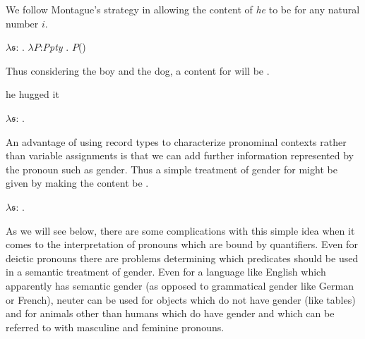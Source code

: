 We follow Montague's strategy in allowing the content of \textit{he}
to be \nexteg{} for any natural number $i$.
\begin{ex}
$\lambda\mathfrak{s}$: . 
        $\lambda P$:\textit{Ppty}
        . $P$()
\label{ex:pronoun-cont}
\end{ex} 
Thus considering the boy and the dog, a
content for  will be .
\begin{ex} 
\begin{subex} 
 
\item he hugged it 
 
\item $\lambda\mathfrak{s}$:
                                 . 
 
\end{subex} 
   
\end{ex} 
An advantage of using record types to characterize pronominal contexts
rather than variable assignments is that we can add further
information represented by the pronoun such as gender.   Thus a simple
treatment of gender for \preveg{} might be given by making the content
be \nexteg{}.
\begin{ex} 
$\lambda\mathfrak{s}$:
                                 . 
\end{ex} 
As we will see below, there are some complications with this simple
idea when it comes to the interpretation of pronouns which are bound
by quantifiers.  Even for deictic pronouns there are problems
determining which predicates should be used in a semantic treatment of
gender.  Even for a language like English which apparently has
semantic gender (as opposed to grammatical gender like German or
French), neuter can be used for objects which do not have gender (like
tables) and for animals other than humans which do have gender and
which can be referred to with masculine and feminine pronouns.

